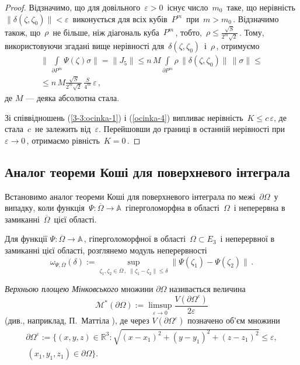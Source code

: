 \documentclass[11pt, reqno]{amsart}
\begin{document}
\begin{proof}
Відзначимо, що для довільного\, $\varepsilon>0$\, існує число\, $m_0$\, таке,
що нерівність\,
$\|\delta(\zeta,\zeta_0)\|<\varepsilon$\, виконується
для всіх кубів\, $P^m$\, при\, $m>m_0$\,. Відзначимо також, що\, $\rho$\,  не
більше, ніж діагональ куба\, $P^m$\,, тобто,\,
$\rho\leq\frac{\sqrt{S}}{2^m\sqrt{2}}$\,. Тому, використовуючи 
згадані вище  нерівності для\,
$\delta(\zeta,\zeta_0)$\, і\, $\rho$\,, отримуємо
\begin{multline}\label{ocinka-4}
\biggr\|\,\int\limits_{\partial
P^m}\Psi(\zeta)\sigma\biggr\|=\|J_5\|\leq
n\,M\int\limits_{\partial
P^m}\rho\,\|\delta(\zeta,\zeta_0)\|\,\|\sigma\|\leq\\
\le n\,M\frac{\sqrt{S}}{2^m\sqrt{2}}\,\frac{S}{4^m}\,\varepsilon\,,
\end{multline}
де $M$ --- деяка абсолютна стала.


Зі співвідношень (\ref{3-3:ocinka-1}) і
(\ref{ocinka-4}) випливає нерівність\, $K\le c\,\varepsilon $, де стала\, $c$\, 
не залежить від\, $\varepsilon$. Перейшовши до границі в останній нерівності при\, $\varepsilon\rightarrow0$\,,
отримаємо рівність\, $K=0$\,.
\end{proof}

\vskip 2mm



\subsection{Аналог теореми Коші для поверхневого інтеграла} 


Вста\-но\-ви\-мо аналог теореми Коші для поверхневого
інтеграла по межі\, $\partial\Omega$\, у випадку, коли функція\,
$\Psi:\overline{\Omega}\rightarrow\mathbb{A}$\, гіперголоморфна в області\, $\Omega$\, 
і неперервна в замиканні\, $\overline{\Omega}$\, цієї області.


Для функції $\Psi:\overline{\Omega}\rightarrow\mathbb{A}$\,,
гіперголоморфної в області\, $\Omega\subset E_3$\, і неперервної в замиканні цієї області,
розглянемо модуль неперервності 
$$\omega_{\Psi,\overline{\Omega}}(\delta):=\sup\limits_{\zeta_1,\zeta_2\in
\overline{\Omega}\,,\,\,\|\zeta_1-\zeta_2\|\leq\delta}\|\Psi(\zeta_1)-\Psi(\zeta_2)\|\,.$$

{\it Верхньою площею Мінковського}  множини $\partial\Omega$ називається величина
$$
\mathcal{M}^*(\partial\Omega):=\limsup\limits_{\varepsilon\rightarrow0}\frac
{V(\partial\Omega^\varepsilon)}{2\varepsilon}
$$
(див., наприклад, П.~Маттіла \cite[с.~79]{Mattila}),
де через $V(\partial\Omega^\varepsilon)$ позначено об'єм множини
\begin{multline*}
\partial\Omega^\varepsilon :=\{(x,y,z)\in\mathbb{R}^3:
\sqrt{(x-x_1)^2+(y-y_1)^2+(z-z_1)^2}\leq\varepsilon,\\
 \, (x_1,y_1,z_1)\in \partial\Omega\}.
\end{multline*}
\end{document}

